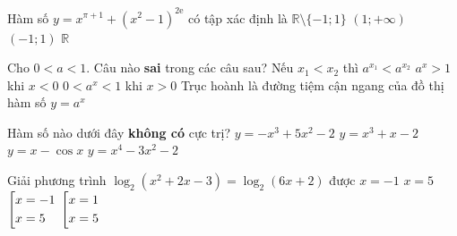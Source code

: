\begin{ex}%
Hàm số $y=x^{\pi+1}+(x^2-1)^{2\mathrm{e}}$ có tập xác định là
\choice
{$\mathbb{R}\setminus \{-1;1\}$}
{\True $(1;+\infty)$}
{$(-1;1)$}
{$\mathbb{R}$} 
\end{ex}

\begin{ex}%
Cho $0<a<1$. Câu nào \textbf{sai} trong các câu sau?
\choice
{\True Nếu $x_1<x_2$ thì $a^{x_1}<a^{x_2}$}
{$a^x>1$ khi $x<0$}
{$0<a^x<1$ khi $x>0$}
{Trục hoành là đường tiệm cận ngang của đồ thị hàm số $y=a^x$}
\end{ex}

\begin{ex}%
Hàm số nào dưới đây \textbf{không có} cực trị?
\choice
{$y=-x^3+5x^2-2$}
{\True $y=x^3+x-2$}
{$y=x-\cos x$}
{$y=x^4-3x^2-2$}
\end{ex}
\begin{ex}%
Giải phương trình $\log_{2}(x^2+2x-3)=\log_{2}(6x+2)$ được
\choice
{$x=-1$}
{\True $x=5$}
{$\left[\begin{aligned}&x=-1\\&x=5\end{aligned}\right.$}
{$\left[\begin{aligned}&x=1\\&x=5\end{aligned}\right.$}
\end{ex}

